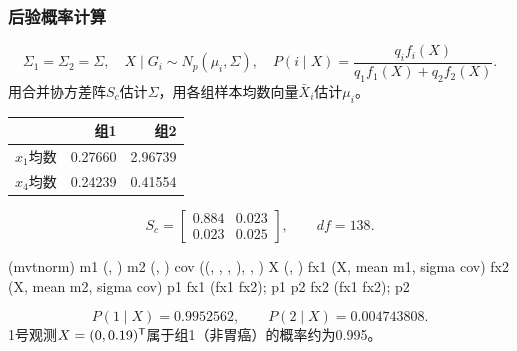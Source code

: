\subsubsection{后验概率计算}
\[
\Sigma_1=\Sigma_2=\Sigma,\quad
X\mid G_i\sim N_p(\mu_i,\Sigma),\quad
P(i\mid X)=\frac{q_if_i(X)}{q_1f_1(X)+q_2f_2(X)}.
\]
用合并协方差阵$S_c$估计$\Sigma$，用各组样本均数向量$\bar X_i$估计$\mu_i$。
\begin{center}\begin{tabular}{lrr}\toprule
&{\bfseries 组1}&{\bfseries 组2}\\\midrule
$x_1$均数&0.27660&2.96739\\$x_4$均数&0.24239&0.41554\\\bottomrule
\end{tabular}\end{center}
\[
S_c=\begin{bmatrix}0.884&0.023\\0.023&0.025\end{bmatrix},\qquad df=138.
\]
\begin{code}
(mvtnorm)
m1 \ROperator{<-} (, )
m2 \ROperator{<-} (, )
cov \ROperator{<-} ((, , , ), , )
X \ROperator{<-} (, )
fx1 \ROperator{<-} (X, mean \ROperator{=} m1, sigma \ROperator{=} cov)
fx2 \ROperator{<-} (X, mean \ROperator{=} m2, sigma \ROperator{=} cov)
p1 \ROperator{<-} fx1 \ROperator{/} (fx1 \ROperator{+} fx2); p1
p2 \ROperator{<-} fx2 \ROperator{/} (fx1 \ROperator{+} fx2); p2
\end{code}
\[
P(1\mid X)=0.9952562,\qquad P(2\mid X)=0.004743808.
\]
1号观测$X=(0,0.19)^{\mathsf T}$属于组1（非胃癌）的概率约为0.995。
